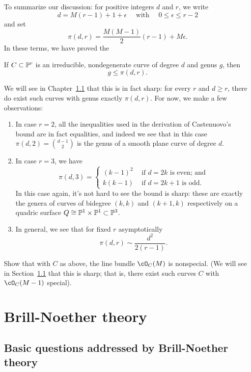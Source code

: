 To summarize our discussion: for positive integers $d$ and $r$, we write
$$
 d = M(r-1) + 1 + \epsilon \quad \text{ with } \quad 0 \leq \epsilon \leq r-2
$$
and set
$$
\pi(d,r) = \frac{M(M-1)}{2}(r-1) + M\epsilon.
$$
In these terms, we have proved the

\begin{theorem}
If $C \subset \PP^r$ is an irreducible, nondegenerate curve of degree $d$ and genus $g$, then
$$
g \leq \pi(d,r).
$$
\end{theorem}

We will see in Chapter~\ref{} that this is in fact sharp: for every $r$ and $d \geq r$, there do exist such curves with genus exactly $\pi(d,r)$. For now, we make a few observations:

\begin{enumerate}
\item In case $r=2$, all the inequalities used in the derivation of Castenuovo's bound are in fact equalities, and indeed we see that in this case $\pi(d,2) = \binom{d-1}{2}$ is the genus of a smooth plane curve of degree $d$.

\item In case $r=3$, we have
$$
\pi(d,3) =
\begin{cases}
\left( k - 1 \right)^2 &\text{ if $d=2k$ is even; and} \\
k(k-1) &\text{ if $d=2k+1$ is odd.}
\end{cases}
$$
In this case again, it's not hard to see the bound is sharp: these are exactly the genera of curves of bidegree $(k,k)$ and $(k+1,k)$ respectively on a quadric surface $Q \cong \PP^1 \times \PP^1 \subset \PP^3$.
\item In general, we see that for fixed $r$ asymptotically
$$
\pi(d,r) \sim \frac{d^2}{2(r-1)}.
$$
\end{enumerate}


\begin{exercise}
Show that with $C$ as above, the line bundle $\cO_C(M)$ is nonspecial. (We will see in Section~\ref{} that this is sharp; that is, there exist such curves $C$ with $\cO_C(M-1)$ special).
\end{exercise}

\section{Brill-Noether theory}

\subsection{Basic questions addressed by Brill-Noether theory}

